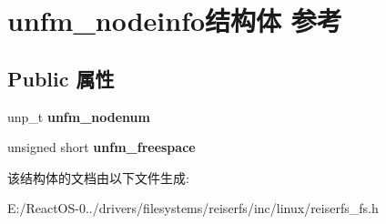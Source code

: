 \hypertarget{structunfm__nodeinfo}{}\section{unfm\+\_\+nodeinfo结构体 参考}
\label{structunfm__nodeinfo}
\subsection*{Public 属性}
\begin{DoxyCompactItemize}
\item 
\mbox{\label{structunfm__nodeinfo_aaa3fb573240703e2954237f95a7196cb}} 
unp\+\_\+t {\bfseries unfm\+\_\+nodenum}
\item 
\mbox{\label{structunfm__nodeinfo_a98126b6046dfa862cb89f4f7d69ab450}} 
unsigned short {\bfseries unfm\+\_\+freespace}
\end{DoxyCompactItemize}


该结构体的文档由以下文件生成\+:\begin{DoxyCompactItemize}
\item 
E\+:/\+React\+O\+S-\/0../drivers/filesystems/reiserfs/inc/linux/reiserfs\+\_\+fs.\+h\end{DoxyCompactItemize}
